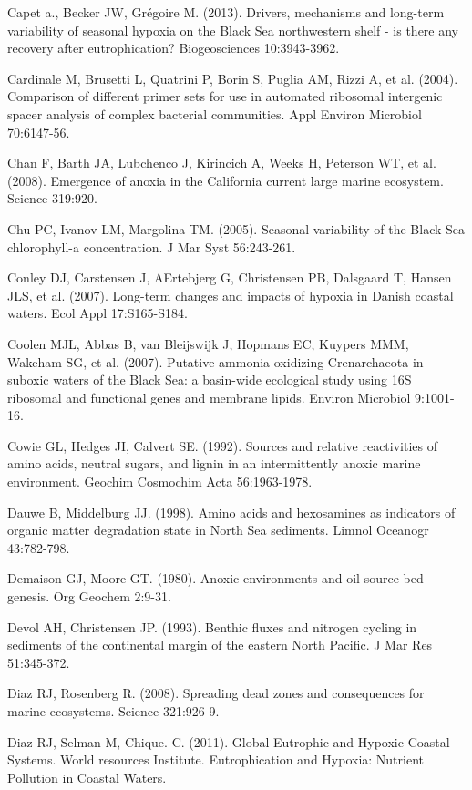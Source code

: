Capet a., Becker JW, Grégoire M. (2013). Drivers, mechanisms and long-term variability of seasonal hypoxia on the Black Sea northwestern shelf - is there any recovery after eutrophication? Biogeosciences 10:3943-3962.

Cardinale M, Brusetti L, Quatrini P, Borin S, Puglia AM, Rizzi A, et al. (2004). Comparison of different primer sets for use in automated ribosomal intergenic spacer analysis of complex bacterial communities. Appl Environ Microbiol 70:6147-56.

Chan F, Barth JA, Lubchenco J, Kirincich A, Weeks H, Peterson WT, et al. (2008). Emergence of anoxia in the California current large marine ecosystem. Science 319:920.

Chu PC, Ivanov LM, Margolina TM. (2005). Seasonal variability of the Black Sea chlorophyll-a concentration. J Mar Syst 56:243-261.

Conley DJ, Carstensen J, AErtebjerg G, Christensen PB, Dalsgaard T, Hansen JLS, et al. (2007). Long-term changes and impacts of hypoxia in Danish coastal waters. Ecol Appl 17:S165-S184.

Coolen MJL, Abbas B, van Bleijswijk J, Hopmans EC, Kuypers MMM, Wakeham SG, et al. (2007). Putative ammonia-oxidizing Crenarchaeota in suboxic waters of the Black Sea: a basin-wide ecological study using 16S ribosomal and functional genes and membrane lipids. Environ Microbiol 9:1001-16.

Cowie GL, Hedges JI, Calvert SE. (1992). Sources and relative reactivities of amino acids, neutral sugars, and lignin in an intermittently anoxic marine environment. Geochim Cosmochim Acta 56:1963-1978.

Dauwe B, Middelburg JJ. (1998). Amino acids and hexosamines as indicators of organic matter degradation state in North Sea sediments. Limnol Oceanogr 43:782-798.

Demaison GJ, Moore GT. (1980). Anoxic environments and oil source bed genesis. Org Geochem 2:9-31.

Devol AH, Christensen JP. (1993). Benthic fluxes and nitrogen cycling in sediments of the continental margin of the eastern North Pacific. J Mar Res 51:345-372.

Diaz RJ, Rosenberg R. (2008). Spreading dead zones and consequences for marine ecosystems. Science 321:926-9.

Diaz RJ, Selman M, Chique. C. (2011). Global Eutrophic and Hypoxic Coastal Systems. World resources Institute. Eutrophication and Hypoxia: Nutrient Pollution in Coastal Waters.

